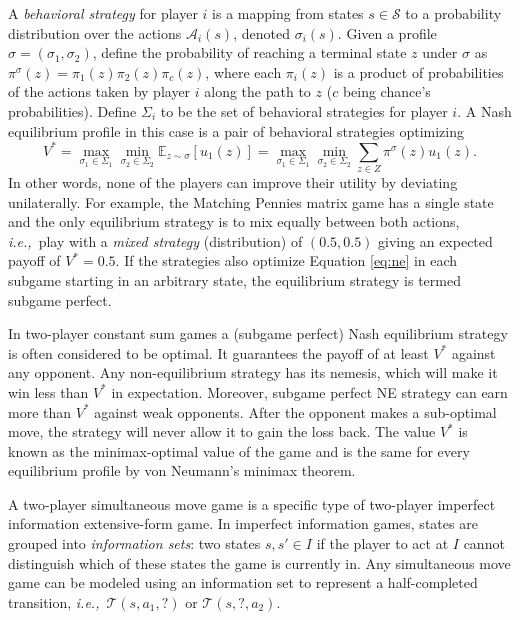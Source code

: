 \documentclass[preprint,12pt]{elsarticle}
\newcommand{\bE}{\mathbb{E}}
\newcommand{\cA}{\mathcal{A}}
\newcommand{\cS}{\mathcal{S}}
\newcommand{\cT}{\mathcal{T}}
\newcommand{\ie}{{\it i.e.,}~}
\begin{document}
A {\it behavioral strategy} for player $i$ is a mapping from states $s \in \cS$
to a probability distribution over the actions $\cA_i(s)$, denoted $\sigma_i(s)$. 
Given a profile $\sigma = (\sigma_1, \sigma_2)$, define the probability of reaching a terminal state $z$ under $\sigma$ as 
$\pi^\sigma(z) = \pi_1(z) \pi_2(z) \pi_c(z)$, where each $\pi_i(z)$ is a product of probabilities of the actions taken 
by player $i$ along the path to $z$ ($c$ being chance's probabilities). Define $\Sigma_i$ to be the set of behavioral 
strategies for player $i$. A Nash equilibrium profile in this case is a pair of behavioral strategies optimizing
\begin{equation}\label{eq:ne}
V^* = \max_{\sigma_1 \in \Sigma_1} \min_{\sigma_2 \in \Sigma_2} \bE_{z \sim \sigma}[u_1(z)]
   = \max_{\sigma_1 \in \Sigma_1} \min_{\sigma_2 \in \Sigma_2} \sum_{z \in Z} \pi^\sigma(z) u_1(z).
\end{equation}
In other words, none of the players can improve their utility by deviating unilaterally. 
For example, the Matching Pennies matrix game has a single state and the only equilibrium strategy is to mix equally between 
both actions, \ie play with a {\it mixed strategy} (distribution) of $(0.5, 0.5)$ giving an expected payoff of $V^* = 0.5$. 
If the strategies also optimize Equation \ref{eq:ne} in each subgame starting in an arbitrary state, the equilibrium strategy 
is termed subgame perfect.

In two-player constant sum games a (subgame perfect) Nash equilibrium strategy is often considered to be optimal. It guarantees 
the payoff of at least $V^*$ against any opponent. Any non-equilibrium strategy has its nemesis, which will make it win less 
than $V^*$ in expectation. Moreover, subgame perfect NE strategy can earn more than $V^*$ against weak opponents. After the 
opponent makes a sub-optimal move, the strategy will never allow it to gain the loss back.
The value $V^*$ is known as the minimax-optimal value of the game
and is the same for every equilibrium profile by von Neumann's minimax theorem.

A two-player simultaneous move game is a specific type of two-player imperfect information extensive-form game. 
In imperfect information games, states are grouped into {\it information sets}: two states $s, s' \in I$ if the player 
to act at $I$ cannot distinguish which of these states the game is currently in. Any simultaneous move game can be modeled 
using an information set to represent a half-completed transition, \ie $\cT(s, a_1, ?)$ or $\cT(s, ?, a_2)$. 
\end{document}
